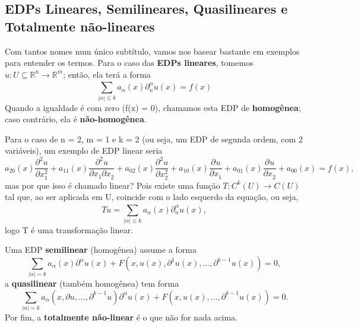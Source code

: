 \documentclass[../pde_notes.tex]{subfiles}
\begin{document}
\subsection{EDPs Lineares, Semilineares, Quasilineares e Totalmente não-lineares}
Com tantos nomes num único subtítulo, vamos nos basear bastante em exemplos para entender os termos. Para o caso das \textbf{EDPs lineares}, tomemos \(u:U\subseteq \mathbb{R}^{n}\rightarrow \mathbb{R}^{m}\); então, ela terá a forma
\[
	\sum\limits_{|\alpha |\leq k}^{}a_{\alpha }(x)\partial_{n}^{\alpha }u(x) = f(x)
\]
Quando a igualdade é com zero (f(x) = 0), chamamos esta EDP de \textbf{homogênea}; caso contrário, ela é \textbf{não-homogênea}.
\begin{example}
	Para o caso de n = 2, m = 1 e k = 2 (ou seja, um EDP de segunda ordem, com 2 variáveis), um exemplo de EDP linear seria
	\[
		a_{20}(x)\frac{\partial^{2}u}{\partial x_{1}^{2}} + a_{11}(x)\frac{\partial^{2}u}{\partial x_{1}\partial x_{2}^{}} + a_02(x)\frac{\partial^{2}u}{\partial x_{2}^{2}} + a_{10}(x)\frac{\partial^{}u}{\partial x_{1}^{}} + a_{01}(x)\frac{\partial^{}u}{\partial x_{2}^{}} + a_{00}(x) = f(x),
	\]
	mas por que isso é chamado linear? Pois existe uma função \(T:C^{k}(U)\rightarrow C(U)\) tal que, ao ser aplicada em U, coincide com o lado esquerdo da equação, ou seja,
	\[
		Tu = \sum\limits_{|\alpha | \leq k}^{}a_{\alpha }(x)\partial_{n}^{\alpha }u(x),
	\]
	logo T é uma transformação linear.
\end{example}
Uma EDP \textbf{semilinear} (homogênea) assume a forma
\[
	\sum\limits_{|\alpha |=k}^{} a_{\alpha }(x)\partial_{}^{\alpha }u(x) + F(x, u(x), \partial^{1}u(x), \dotsc , \partial^{k-1}u(x)) = 0,
\]
a \textbf{quasilinear} (também homogênea) tem forma
\[
	\sum\limits_{|\alpha | = k}^{} a_{\alpha }(x, \partial u, \dotsc , \partial^{k-1}u)\partial^{\alpha }u(x) + F(x, u(x), \dotsc, \partial^{k-1}u(x)) = 0.
\]
Por fim, a \textbf{totalmente não-linear} é o que não for nada acima.
\end{document}

